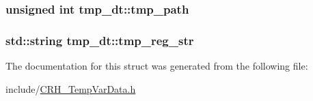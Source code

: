 \subsubsection[{tmp\+\_\+path}]{\setlength{\rightskip}{0pt plus 5cm}unsigned int tmp\+\_\+dt\+::tmp\+\_\+path\hspace{0.3cm}{\ttfamily [static]}}\hypertarget{structtmp__dt_a5133f5ea97efb23fde6f33ec7c8d454e}{}\label{structtmp__dt_a5133f5ea97efb23fde6f33ec7c8d454e}
\subsubsection[{tmp\+\_\+reg\+\_\+str}]{\setlength{\rightskip}{0pt plus 5cm}std\+::string tmp\+\_\+dt\+::tmp\+\_\+reg\+\_\+str\hspace{0.3cm}{\ttfamily [static]}}\hypertarget{structtmp__dt_ae8a89114cd6dda550e3d1561f6fdc7a9}{}\label{structtmp__dt_ae8a89114cd6dda550e3d1561f6fdc7a9}


The documentation for this struct was generated from the following file\+:\begin{DoxyCompactItemize}
\item 
include/\hyperlink{_c_r_h___temp_var_data_8h}{C\+R\+H\+\_\+\+Temp\+Var\+Data.\+h}\end{DoxyCompactItemize}

